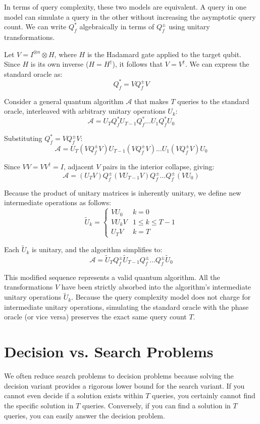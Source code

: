 In terms of query complexity, these two models are equivalent. A query in one model can simulate a query in the other without increasing the asymptotic query count. We can write $Q_f^*$ algebraically in terms of $Q_f^{\pm}$ using unitary transformations.

Let $V = I^{\otimes n} \otimes H$, where $H$ is the Hadamard gate applied to the target qubit. Since $H$ is its own inverse ($H = H^\dagger$), it follows that $V = V^\dagger$. We can express the standard oracle as:
\[ Q_f^* = V Q_f^{\pm} V \]

Consider a general quantum algorithm $\mathcal{A}$ that makes $T$ queries to the standard oracle, interleaved with arbitrary unitary operations $U_k$:
\[ \mathcal{A} = U_T Q_f^* U_{T-1} Q_f^* \dots U_1 Q_f^* U_0 \]

Substituting $Q_f^* = V Q_f^{\pm} V$:
\[ \mathcal{A} = U_T (V Q_f^{\pm} V) U_{T-1} (V Q_f^{\pm} V) \dots U_1 (V Q_f^{\pm} V) U_0 \]

Since $VV = V V^\dagger = I$, adjacent $V$ pairs in the interior collapse, giving:
\[ \mathcal{A} = (U_T V) Q_f^{\pm} (V U_{T-1} V) Q_f^{\pm} \dots Q_f^{\pm} (V U_0) \]

Because the product of unitary matrices is inherently unitary, we define new intermediate operations as follows:
\[
\tilde{U}_k = \begin{cases} V U_0 & k = 0 \\ V U_k V & 1 \leq k \leq T-1 \\ U_T V & k = T \end{cases}
\]

Each $\tilde{U}_k$ is unitary, and the algorithm simplifies to:
\[ \mathcal{A} = \tilde{U}_T Q_f^{\pm} \tilde{U}_{T-1} Q_f^{\pm} \dots Q_f^{\pm} \tilde{U}_0 \]

This modified sequence represents a valid quantum algorithm. All the transformations $V$ have been strictly absorbed into the algorithm's intermediate unitary operations $\tilde{U}_k$. Because the query complexity model does not charge for intermediate unitary operations, simulating the standard oracle with the phase oracle (or vice versa) preserves the exact same query count $T$.

\section{Decision vs. Search Problems}
We often reduce search problems to decision problems because solving the decision variant provides a rigorous lower bound for the search variant. If you cannot even decide if a solution exists within $T$ queries, you certainly cannot find the specific solution in $T$ queries. Conversely, if you can find a solution in $T$ queries, you can easily answer the decision problem. 

